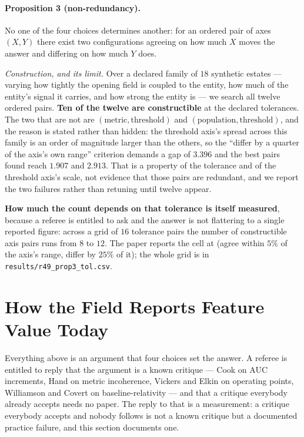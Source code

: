 \documentclass[preprint,12pt]{elsarticle}
\begin{document}
\paragraph{Proposition 3 (non-redundancy).} No one of the four choices
determines another: for an ordered pair of axes $(X,Y)$ there exist two
configurations agreeing on how much $X$ moves the answer and differing on how
much $Y$ does.

\emph{Construction, and its limit.} Over a declared family of $18$ synthetic
estates --- varying how tightly the opening field is coupled to the entity,
how much of the entity's signal it carries, and how strong the entity is ---
we search all twelve ordered pairs. \textbf{Ten of the twelve are
constructible} at the declared tolerances. The two that are not are
$(\text{metric}, \text{threshold})$ and $(\text{population},
\text{threshold})$, and the reason is stated rather than hidden: the
threshold axis's spread across this family is an order of magnitude larger
than the others, so the ``differ by a quarter of the axis's own range''
criterion demands a gap of
$3.396$ and the best pairs found reach $1.907$ and $2.913$. That is a
property of the tolerance and of the threshold axis's scale, not evidence
that those pairs are redundant, and we report the two failures rather than
retuning until twelve appear.

\textbf{How much the count depends on that tolerance is itself measured},
because a referee is entitled to ask and the answer is not flattering to a
single reported figure: across a grid of $16$ tolerance pairs the number of
constructible axis pairs runs from $8$ to $12$. The paper reports the cell at
(agree within $5\%$ of the axis's range, differ by $25\%$ of it); the whole
grid is in \texttt{results/r49\_prop3\_tol.csv}.

\section{How the Field Reports Feature Value Today}
\label{sec:audit}

Everything above is an argument that four choices set the answer. A referee is
entitled to reply that the argument is a known critique --- Cook on AUC
increments, Hand on metric incoherence, Vickers and Elkin on operating points,
Williamson and Covert on baseline-relativity --- and that a critique everybody
already accepts needs no paper. The reply to that is a measurement: a critique
everybody accepts and nobody follows is not a known critique but a documented
practice failure, and this section documents one.
\end{document}
